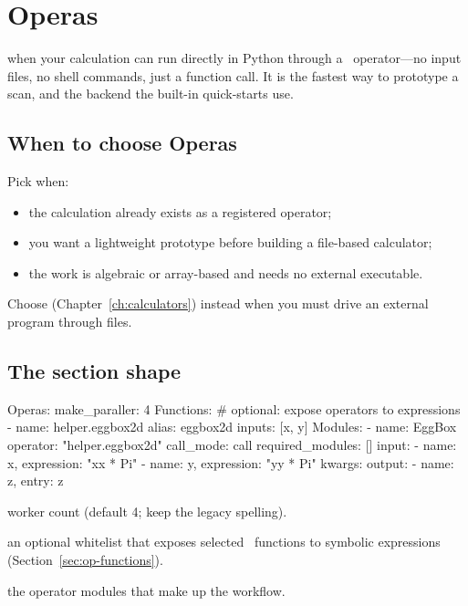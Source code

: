 \chapter{Operas}
\label{ch:operas}

 when your calculation can run directly in Python through a
\Operas\ operator---no input files, no shell commands, just a function call. It is the fastest way
to prototype a scan, and the backend the built-in quick-starts use.

\section{When to choose Operas}
\label{sec:op-when}

Pick  when:

\begin{itemize}
  \item the calculation already exists as a registered operator;
  \item you want a lightweight prototype before building a file-based calculator;
  \item the work is algebraic or array-based and needs no external executable.
\end{itemize}

\noindent Choose  (Chapter~\ref{ch:calculators}) instead when you must drive
an external program through files.

\section{The section shape}
\label{sec:op-shape}

\begin{yamlwin}
Operas:
  make_paraller: 4
  Functions:                      # optional: expose operators to expressions
    - name: helper.eggbox2d
      alias: eggbox2d
      inputs: [x, y]
  Modules:
    - name: EggBox
      operator: "helper.eggbox2d"
      call_mode: call
      required_modules: []
      input:
        - {name: x, expression: "xx * Pi"}
        - {name: y, expression: "yy * Pi"}
      kwargs: {}
      output:
        - {name: z, entry: z}
\end{yamlwin}

\begin{description}[style=nextline, leftmargin=1.2em]
  \item[\yamlkey{make\_paraller}] worker count (default 4; keep the legacy spelling).
  \item[\yamlkey{Functions}] an optional whitelist that exposes selected \Operas\ functions to
        symbolic expressions (Section~\ref{sec:op-functions}).
  \item[\yamlkey{Modules}] the operator modules that make up the workflow.
\end{description}

